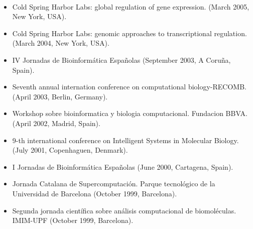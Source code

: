 \vspace{0.5cm}
\\

\begin{itemize}

\item Cold Spring Harbor Labs: global regulation of gene expression. (March 2005, New York, USA). 

\item Cold Spring Harbor Labs: genomic approaches to transcriptional regulation. (March 2004, New York, USA). 

\item IV Jornadas de Bioinform\'atica Espa\~nolas (September 2003, A Coru\~na, Spain). 

\item Seventh annual internation conference on computational biology-RECOMB. (April 2003, Berlin, Germany).

\item Workshop sobre bioinformatica y biologia computacional. Fundacion BBVA. (April 2002, Madrid, Spain).

\item 9-th international conference on Intelligent Systems in Molecular Biology. (July 2001, Copenhaguen, Denmark).

\item I Jornadas de Bioinform\'atica Espa\~nolas (June 2000, Cartagena, Spain). 

\item Jornada Catalana de Supercomputaci\'on. Parque tecnol\'ogico de la Universidad de 
Barcelona (October 1999, Barcelona). 

\item Segunda jornada cient\'ifica sobre an\'alisis computacional de biomol\'eculas. IMIM-UPF (October 1999, Barcelona).
\end{itemize}





